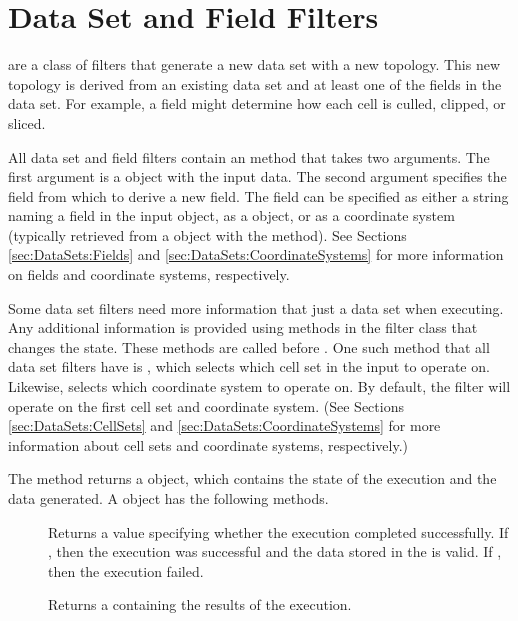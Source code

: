 

\section{Data Set and Field Filters}


 are a class of filters that generate a
new data set with a new topology. This new topology is derived from an
existing data set and at least one of the fields in the data set. For
example, a field might determine how each cell is culled, clipped, or
sliced.

All data set and field filters contain an  method that
takes two arguments. The first argument is a  object with
the input data. The second argument specifies the field from which to
derive a new field. The field can be specified as either a string naming a
field in the input  object, as a 
object, or as a coordinate system (typically retrieved from a
 object with the 
method). See Sections \ref{sec:DataSets:Fields} and
\ref{sec:DataSets:CoordinateSystems} for more information on fields and
coordinate systems, respectively.

Some data set filters need more information that just a data set when
executing. Any additional information is provided using methods in the
filter class that changes the state. These methods are called before
. One such method that all data set filters have is
, which selects which cell set in the input
 to operate on. Likewise,
 selects which coordinate system to
operate on. By default, the filter will operate on the first cell set and
coordinate system. (See Sections \ref{sec:DataSets:CellSets} and
\ref{sec:DataSets:CoordinateSystems} for more information about cell sets
and coordinate systems, respectively.)

The  method returns a  object,
which contains the state of the execution and the data generated. A
 object has the following methods.

\begin{description}
\item[] Returns a  value specifying
  whether the execution completed successfully. If , then
  the execution was successful and the data stored in the
   is valid. If , then the
  execution failed.
\item[] Returns a  containing
  the results of the execution.
\end{description}

